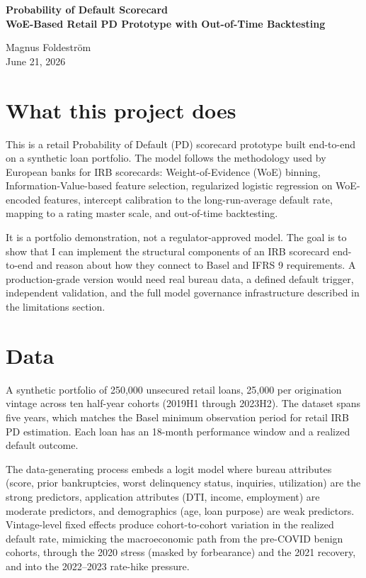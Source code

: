 \documentclass[a4paper,11pt]{article}
\begin{document}
\begin{titlepage}
\thispagestyle{empty}
\centering
\vspace*{3cm}
{\Huge\bfseries Probability of Default Scorecard\\\bigskip
\LARGE WoE-Based Retail PD Prototype with Out-of-Time Backtesting
\par}
\vspace{1.5cm}
{\Large Magnus Foldeström\\ June 21, 2026\par}
\vfill
\end{titlepage}

\section{What this project does}

This is a retail Probability of Default (PD) scorecard prototype built
end-to-end on a synthetic loan portfolio. The model follows the
methodology used by European banks for IRB scorecards: Weight-of-Evidence
(WoE) binning, Information-Value-based feature selection, regularized
logistic regression on WoE-encoded features, intercept calibration to
the long-run-average default rate, mapping to a rating master scale,
and out-of-time backtesting.

It is a portfolio demonstration, not a regulator-approved model. The
goal is to show that I can implement the structural components of an
IRB scorecard end-to-end and reason about how they connect to Basel
and IFRS 9 requirements. A production-grade version would need real
bureau data, a defined default trigger, independent validation, and
the full model governance infrastructure described in the limitations
section.

\section{Data}

A synthetic portfolio of 250,000 unsecured retail loans, 25,000 per
origination vintage across ten half-year cohorts (2019H1 through
2023H2). The dataset spans five years, which matches the Basel minimum
observation period for retail IRB PD estimation. Each loan has an
18-month performance window and a realized default outcome.

The data-generating process embeds a logit model where bureau
attributes (score, prior bankruptcies, worst delinquency status,
inquiries, utilization) are the strong predictors, application
attributes (DTI, income, employment) are moderate predictors, and
demographics (age, loan purpose) are weak predictors. Vintage-level
fixed effects produce cohort-to-cohort variation in the realized
default rate, mimicking the macroeconomic path from the pre-COVID
benign cohorts, through the 2020 stress (masked by forbearance) and
the 2021 recovery, and into the 2022--2023 rate-hike pressure.
\end{document}
